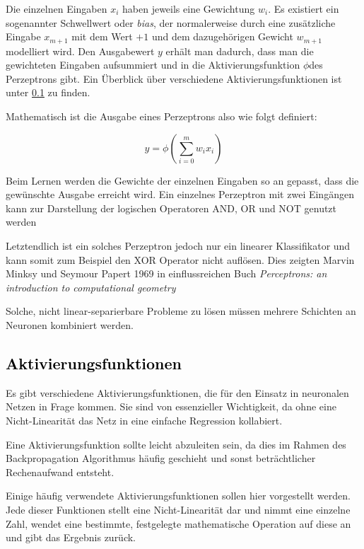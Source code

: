 Die einzelnen Eingaben \(x_i\) haben jeweils eine Gewichtung \(w_i\).
Es existiert ein sogenannter Schwellwert oder \textit{bias}, der normalerweise 
durch eine zusätzliche Eingabe \(x_{m+1}\) mit dem Wert \(+1\) und dem dazugehörigen Gewicht \(w_{m+1}\) modelliert wird.
Den Ausgabewert \(y\) erhält man dadurch, dass man die gewichteten Eingaben aufsummiert und in die Aktivierungsfunktion \( \phi \)des Perzeptrons gibt.
Ein Überblick über verschiedene Aktivierungsfunktionen ist unter \ref{sec:activationfuncs} zu finden.

Mathematisch ist die Ausgabe eines Perzeptrons also wie folgt definiert:

\begin{equation}
	y = \phi ( \sum_{i= 0}^{m} w_i x_i)
\end{equation}

Beim Lernen werden die Gewichte der einzelnen Eingaben so an gepasst, dass die gewünschte Ausgabe erreicht wird.
Ein einzelnes Perzeptron mit zwei Eingängen kann zur Darstellung der logischen Operatoren AND, OR und NOT genutzt werden

Letztendlich ist ein solches Perzeptron jedoch nur ein linearer Klassifikator und kann somit zum Beispiel den XOR Operator nicht auflösen.
Dies zeigten Marvin Minksy und Seymour Papert 1969 in einflussreichen Buch \textit{Perceptrons: an introduction to computational geometry} 

Solche, nicht linear-separierbare Probleme zu lösen müssen mehrere Schichten an Neuronen kombiniert werden.

\subsection{\textcolor{black}{Aktivierungsfunktionen}}
\label{sec:activationfuncs}
Es gibt verschiedene Aktivierungsfunktionen, die für den Einsatz in neuronalen Netzen in Frage kommen.
Sie sind von essenzieller Wichtigkeit, da ohne eine Nicht-Linearität das Netz in eine einfache Regression kollabiert.

Eine Aktivierungsfunktion sollte leicht abzuleiten sein, 
da dies im Rahmen des Backpropagation Algorithmus häufig geschieht und sonst beträchtlicher Rechenaufwand entsteht.

Einige häufig verwendete Aktivierungsfunktionen sollen hier vorgestellt werden.
Jede dieser Funktionen stellt eine Nicht-Linearität dar und nimmt eine einzelne Zahl, wendet eine bestimmte, festgelegte mathematische 
Operation auf diese an und gibt das Ergebnis zurück.

